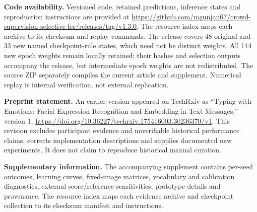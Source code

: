 \documentclass[pdflatex,sn-mathphys-num]{sn-jnl}
\begin{document}
\noindent\textbf{Code availability.} Versioned code, retained predictions, inference states and reproduction instructions are provided at \url{https://github.com/mgunjan67/crowd-supervision-selective-fer/releases/tag/v1.3.0}. The resource index maps each archive to its checksum and replay commands. The release covers 48 original and 33 new named checkpoint-rule states, which need not be distinct weights. All 144 new epoch weights remain locally retained; their hashes and selection outputs accompany the release, but intermediate epoch weights are not redistributed. The source ZIP separately compiles the current article and supplement. Numerical replay is internal verification, not external replication.

\noindent\textbf{Preprint statement.} An earlier version appeared on TechRxiv as ``Typing with Emotions: Facial Expression Recognition and Embedding in Text Messages,'' version 1, \url{https://doi.org/10.36227/techrxiv.175416003.30236370/v1}. This revision excludes participant evidence and unverifiable historical performance claims, corrects implementation descriptions and supplies documented new experiments. It does not claim to reproduce historical manual curation.

\noindent\textbf{Supplementary information.} The accompanying supplement contains per-seed outcomes, learning curves, fixed-image matrices, vocabulary and calibration diagnostics, external score/reference sensitivities, prototype details and provenance. The resource index maps each evidence archive and checkpoint collection to its checksum manifest and instructions.

\FloatBarrier

\end{document}
